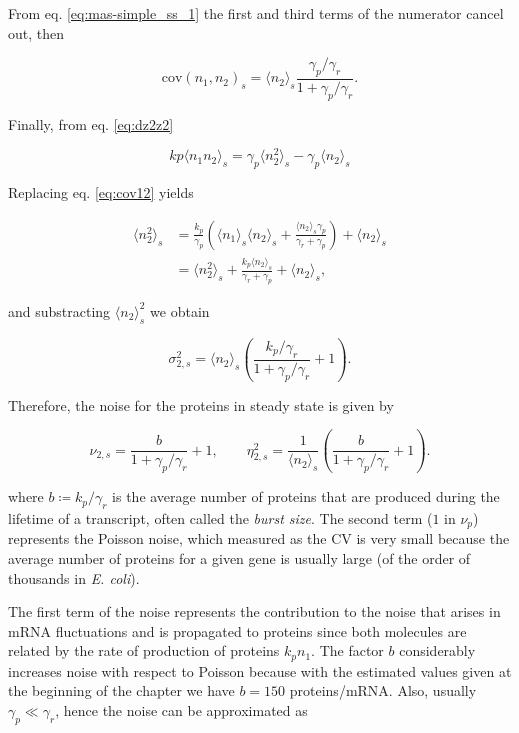 From eq. \eqref{eq:mas-simple_ss_1} the first and third terms of the numerator cancel out, then

\begin{equation}
  \label{eq:cov12}
  \text{cov}(n_1,n_2)_s = \langle n_2 \rangle_s\frac{\gamma_p/\gamma_r}{1+\gamma_p/\gamma_r}.
\end{equation}

Finally, from eq. \eqref{eq:dz2z2}

\begin{equation*}
kp\langle n_1n_2\rangle_s = \gamma_p\langle n_2^2\rangle_s-\gamma_p\langle n_2\rangle_s
\end{equation*}

Replacing eq. \eqref{eq:cov12} yields

\begin{align*}
  \langle n_2^2\rangle_s &= \frac{k_p}{\gamma_p}\left(\langle n_1 \rangle_s\langle n_2\rangle_s + \frac{\langle n_2\rangle_s\gamma_p}{\gamma_r+\gamma_p}\right) + \langle n_2 \rangle_s\\
  &=\langle n_2^2\rangle_s+\frac{k_p\langle n_2\rangle_s}{\gamma_r+\gamma_p}+\langle n_2 \rangle_s,
\end{align*}

and substracting $\langle n_2\rangle_s^2$ we obtain

\begin{equation*}
  \sigma_{2,s}^2 = \langle n_2\rangle_s\left(\frac{k_p/\gamma_r}{1+\gamma_p/\gamma_r}+1\right).
\end{equation*}

Therefore, the noise for the proteins in steady state is given by

\begin{equation}
  \label{eq:noise2}
  \nu_{2,s} = \frac{b}{1+\gamma_p/\gamma_r}+1, \quad \quad \eta_{2,s}^2 = \frac{1}{\langle n_2\rangle_s}\left(\frac{b}{1+\gamma_p/\gamma_r}+1\right).
\end{equation}

where $b\coloneqq k_p/\gamma_r$ is the average number of proteins that are produced during the lifetime of a transcript, often called the \textit{burst size}. The second term ($1$ in $\nu_p$) represents the Poisson noise, which measured as the CV is very small because the average number of proteins for a given gene is usually large (of the order of thousands in \textit{E. coli}).

The first term of the noise represents the contribution to the noise that arises in mRNA fluctuations and is propagated to proteins since both molecules are related by the rate of production of proteins $k_pn_1$. The factor $b$ considerably increases noise with respect to Poisson because with the estimated values given at the beginning of the chapter we have $b=150$ proteins/mRNA. Also, usually $\gamma_p \ll \gamma_r$, hence the noise can be approximated as

